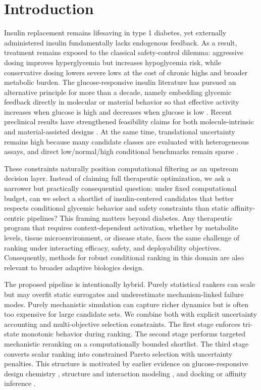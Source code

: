 \documentclass{article} %
\begin{document}
\section{Introduction}
Insulin replacement remains lifesaving in type 1 diabetes, yet externally administered insulin fundamentally lacks endogenous feedback. As a result, treatment remains exposed to the classical safety-control dilemma: aggressive dosing improves hyperglycemia but increases hypoglycemia risk, while conservative dosing lowers severe lows at the cost of chronic highs and broader metabolic burden. The glucose-responsive insulin literature has pursued an alternative principle for more than a decade, namely embedding glycemic feedback directly in molecular or material behavior so that effective activity increases when glucose is high and decreases when glucose is low \citep{src01,src02,src09,src10,src11}. Recent preclinical results have strengthened feasibility claims for both molecule-intrinsic and material-assisted designs \citep{src01,src12,src13,src41,src42,src43}. At the same time, translational uncertainty remains high because many candidate classes are evaluated with heterogeneous assays, and direct low/normal/high conditional benchmarks remain sparse \citep{src02,src10,src11,src44}.

These constraints naturally position computational filtering as an upstream decision layer. Instead of claiming full therapeutic optimization, we ask a narrower but practically consequential question: under fixed computational budget, can we select a shortlist of insulin-centered candidates that better respects conditional glycemic behavior and safety constraints than static affinity-centric pipelines? This framing matters beyond diabetes. Any therapeutic program that requires context-dependent activation, whether by metabolite levels, tissue microenvironment, or disease state, faces the same challenge of ranking under interacting efficacy, safety, and deployability objectives. Consequently, methods for robust conditional ranking in this domain are also relevant to broader adaptive biologics design.

The proposed pipeline is intentionally hybrid. Purely statistical rankers can scale but may overfit static surrogates and underestimate mechanism-linked failure modes. Purely mechanistic simulation can capture richer dynamics but is often too expensive for large candidate sets. We combine both with explicit uncertainty accounting and multi-objective selection constraints. The first stage enforces tri-state monotonic behavior during ranking. The second stage performs targeted mechanistic reranking on a computationally bounded shortlist. The third stage converts scalar ranking into constrained Pareto selection with uncertainty penalties. This structure is motivated by earlier evidence on glucose-responsive design chemistry \citep{src01,src03,src06,src15}, structure and interaction modeling \citep{src16,src17,src23,src33,src38}, and docking or affinity inference \citep{src24,src26,src27,src28,src39,src40}.
\end{document}
